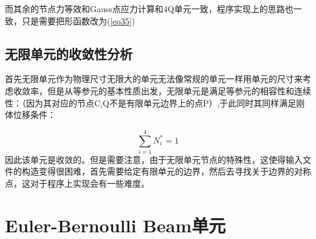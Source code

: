 \documentclass[forprint]{WHUBachelor}
\begin{document}
而其余的节点力等效和Gauss点应力计算和4Q单元一致，程序实现上的思路也一致，只是需要把形函数改为(\ref{eq35})

\subsection{无限单元的收敛性分析}

首先无限单元作为物理尺寸无限大的单元无法像常规的单元一样用单元的尺寸来考虑收敛率，但是从等参元的基本性质出发，无限单元是满足等参元的相容性和连续性：（因为其对应的节点C,Q不是有限单元边界上的点P）,于此同时其同样满足刚体位移条件：

\begin{equation}
\sum_{i=1}^{4}N_{i}^{*}=1\label{eq38}
\end{equation}
因此该单元是收敛的。但是需要注意，由于无限单元节点的特殊性，这使得输入文件的构造变得很困难，首先需要给定有限单元的边界，然后去寻找关于边界的对称点，这对于程序上实现会有一些难度。
\section{Euler-Bernoulli Beam单元}
\end{document}
